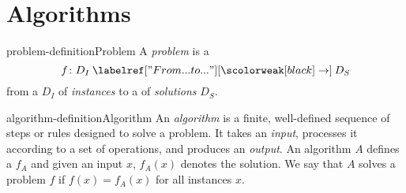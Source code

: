 \documentclass[preview]{standalone}
\begin{document}
\genpage

\section{Algorithms}

\begin{snippetdefinition}{problem-definition}{Problem}
    A \emph{problem} is a \function
    \[
        f\colon D_I \fromto D_S
    \]
    from a \set \(D_I\) of \emph{instances} to a \set of \emph{solutions} \(D_S\).
\end{snippetdefinition}

\begin{snippetdefinition}{algorithm-definition}{Algorithm}
    An \emph{algorithm} is a finite, well-defined sequence of steps or rules designed to solve a problem.
    It takes an \emph{input}, processes it according to a set of operations, and produces an \emph{output}.
    An algorithm \(A\) defines a \function \(f_A\) and given an input \(x\), \(f_A(x)\) denotes the solution.
    We say that \(A\) solves a problem \(f\) if \(f(x) = f_A(x)\) for all instances \(x\).
\end{snippetdefinition}
\end{document}
